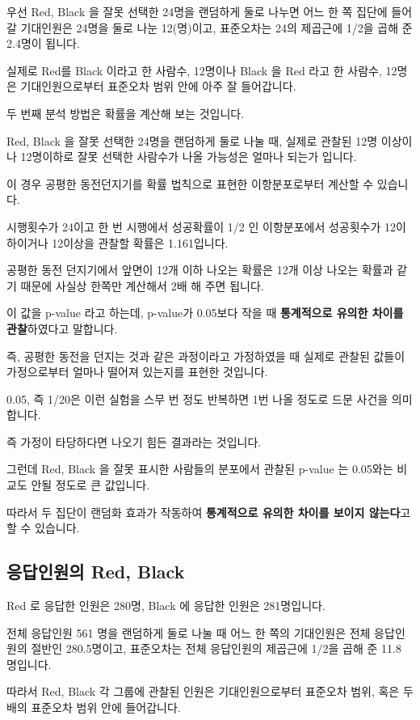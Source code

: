 \documentclass[
]{book}
\begin{document}
우선 Red, Black 을 잘못 선택한 24명을 랜덤하게 둘로 나누면 어느 한 쪽 집단에 들어갈 기대인원은 24명을 둘로 나눈 12(명)이고, 표준오차는 24의 제곱근에 1/2을 곱해 준 2.4명이 됩니다.

실제로 Red를 Black 이라고 한 사람수, 12명이나 Black 을 Red 라고 한 사람수, 12명은 기대인원으로부터 표준오차 범위 안에 아주 잘 들어갑니다.

두 번째 분석 방법은 확률을 계산해 보는 것입니다.

Red, Black 을 잘못 선택한 24명을 랜덤하게 둘로 나눌 때, 실제로 관찰된 12명 이상이나 12명이하로 잘못 선택한 사람수가 나올 가능성은 얼마나 되는가 입니다.

이 경우 공평한 동전던지기를 확률 법칙으로 표현한 이항분포로부터 계산할 수 있습니다.

시행횟수가 24이고 한 번 시행에서 성공확률이 1/2 인 이항분포에서 성공횟수가 12이하이거나 12이상을 관찰할 확률은 1.161입니다.

공평한 동전 던지기에서 앞면이 12개 이하 나오는 확률은 12개 이상 나오는 확률과 같기 때문에 사실상 한쪽만 계산해서 2배 해 주면 됩니다.

이 값을 p-value 라고 하는데, p-value가 0.05보다 작을 때 \textbf{통계적으로 유의한 차이를 관찰}하였다고 말합니다.

즉, 공평한 동전을 던지는 것과 같은 과정이라고 가정하였을 때 실제로 관찰된 값들이 가정으로부터 얼마나 떨어져 있는지를 표현한 것입니다.

0.05, 즉 1/20은 이런 실험을 스무 번 정도 반복하면 1번 나올 정도로 드문 사건을 의미합니다.

즉 가정이 타당하다면 나오기 힘든 결과라는 것입니다.

그런데 Red, Black 을 잘못 표시한 사람들의 분포에서 관찰된 p-value 는 0.05와는 비교도 안될 정도로 큰 값입니다.

따라서 두 집단이 랜덤화 효과가 작동하여 \textbf{통계적으로 유의한 차이를 보이지 않는다}고 할 수 있습니다.

\subsection{응답인원의 Red, Black}\label{uxc751uxb2f5uxc778uxc6d0uxc758-red-black-1}

Red 로 응답한 인원은 280명, Black 에 응답한 인원은 281명입니다.

전체 응답인원 561 명을 랜덤하게 둘로 나눌 때 어느 한 쪽의 기대인원은 전체 응답인원의 절반인 280.5명이고, 표준오차는 전체 응답인원의 제곱근에 1/2을 곱해 준 11.8 명입니다.

따라서 Red, Black 각 그룹에 관찰된 인원은 기대인원으로부터 표준오차 범위, 혹은 두배의 표준오차 범위 안에 들어갑니다.
\end{document}
